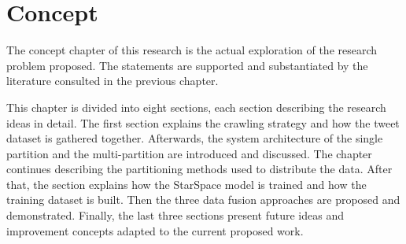 \chapter{Concept}

The concept chapter of this research is the actual exploration of the research problem proposed. The statements are supported and substantiated by the literature consulted in the previous chapter.

This chapter is divided into eight sections, each section describing the research ideas in detail. The first section explains the crawling strategy and how the tweet dataset is gathered together. Afterwards, the system architecture of the single partition and the multi-partition are introduced and discussed. The chapter continues describing the partitioning methods used to distribute the data. After that, the section explains how the StarSpace model is trained and how the training dataset is built. Then the three data fusion approaches are proposed and demonstrated. Finally, the last three sections present future ideas and improvement concepts adapted to the current proposed work.
